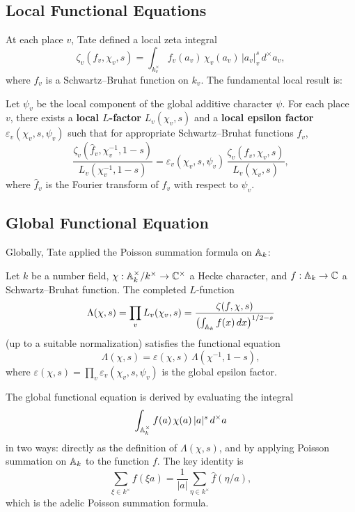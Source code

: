 \subsection{Local Functional Equations}

At each place \(v\), Tate defined a local zeta integral
\[
\zeta_v(f_v, \chi_v, s) = \int_{k_v^\times} f_v(a_v) \, \chi_v(a_v) \, |a_v|_v^s \, d^\times a_v,
\]
where \(f_v\) is a Schwartz--Bruhat function on \(k_v\). The fundamental local result is:

\begin{theorem}
Let \(\psi_v\) be the local component of the global additive character \(\psi\). For each place \(v\), there exists a \textbf{local \(L\)-factor} \(L_v(\chi_v, s)\) and a \textbf{local epsilon factor} \(\varepsilon_v(\chi_v, s, \psi_v)\) such that for appropriate Schwartz--Bruhat functions \(f_v\),
\[
\frac{\zeta_v(\widehat{f}_v, \chi_v^{-1}, 1-s)}{L_v(\chi_v^{-1}, 1-s)}
= \varepsilon_v(\chi_v, s, \psi_v)\,
\frac{\zeta_v(f_v, \chi_v, s)}{L_v(\chi_v, s)},
\]
where \(\widehat{f}_v\) is the Fourier transform of \(f_v\) with respect to \(\psi_v\).
\end{theorem}

\subsection{Global Functional Equation}

Globally, Tate applied the Poisson summation formula on \(\mathbb{A}_k\):

\begin{theorem}
Let \(k\) be a number field, \(\chi: \mathbb{A}_k^\times/k^\times \to \mathbb{C}^\times\) a Hecke character, and \(f: \mathbb{A}_k \to \mathbb{C}\) a Schwartz--Bruhat function. The completed \(L\)-function
\[
\Lambda(\chi, s) = \prod_v L_v(\chi_v, s) = \frac{\zeta(f, \chi, s)}{ \bigl( \int_{\mathbb{A}_k} f(x)\,dx \bigr)^{1/2 - s} }
\]
(up to a suitable normalization) satisfies the functional equation
\[
\Lambda(\chi, s) = \varepsilon(\chi, s) \, \Lambda(\chi^{-1}, 1-s),
\]
where \(\varepsilon(\chi, s) = \prod_v \varepsilon_v(\chi_v, s, \psi_v)\) is the global epsilon factor.
\end{theorem}

The global functional equation is derived by evaluating the integral
\[
\int_{\mathbb{A}_k^\times} f(a) \, \chi(a) \, |a|^s \, d^\times a
\]
in two ways: directly as the definition of \(\Lambda(\chi, s)\), and by applying Poisson summation on \(\mathbb{A}_k\) to the function \(f\). The key identity is
\[
\sum_{\xi \in k^\times} f(\xi a) = \frac{1}{|a|} \sum_{\eta \in k^\times} \widehat{f}(\eta / a),
\]
which is the adelic Poisson summation formula.

